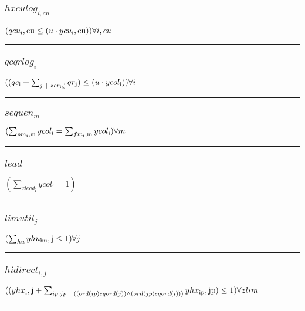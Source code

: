 \documentclass[11pt]{article}
\begin{document}
\subsubsection*{$hxculog_{i,cu}$}
$
(qcu_\text{i},\text{cu} \leq (u \cdot ycu_\text{i},\text{cu}))\hfill \forall i,cu
$
\vspace{5pt}
\hrule
\subsubsection*{$qcqrlog_{i}$}
$
((qc_\text{i} + \sum_{j ~ | ~ zcr_\text{i},\text{j}} qr_\text{j}) \leq (u \cdot ycol_\text{i}))\hfill \forall i
$
\vspace{5pt}
\hrule
\subsubsection*{$sequen_{m}$}
$
(\sum_{pm_\text{i},\text{m}} ycol_\text{i} = \sum_{fm_\text{i},\text{m}} ycol_\text{i})\hfill \forall m
$
\vspace{5pt}
\hrule
\subsubsection*{$lead$}
$
(\sum_{zlead_\text{i}} ycol_\text{i} = 1)
$
\vspace{5pt}
\hrule
\subsubsection*{$limutil_{j}$}
$
(\sum_{hu} yhu_\text{hu},\text{j} \leq 1)\hfill \forall j
$
\vspace{5pt}
\hrule
\subsubsection*{$hidirect_{i,j}$}
$
((yhx_\text{i},\text{j} + \sum_{ip,jp ~ | ~ ((ord(ip) eq ord(j)) \wedge (ord(jp) eq ord(i)))} yhx_\text{ip},\text{jp}) \leq 1)\hfill \forall zlim
$
\vspace{5pt}
\hrule
\end{document}
